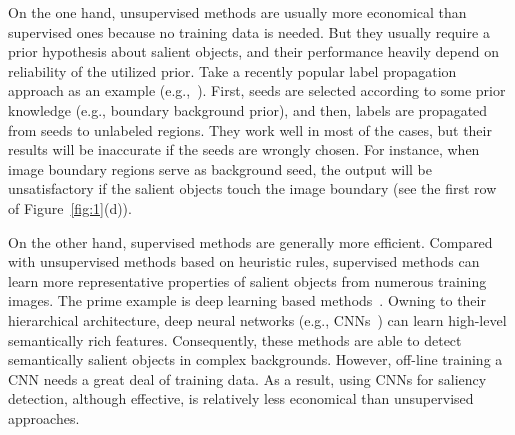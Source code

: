 \documentclass[journal]{IEEEtran}
\begin{document}
On the one hand, unsupervised methods are usually more economical than supervised ones because no training data is needed. But they usually require a prior hypothesis about salient objects, and their performance heavily depend on reliability of the utilized prior. Take a recently popular label propagation approach as an example (e.g.,~\cite{Jiang2013Saliency}\cite{yang2013saliency}\cite{Kong2016Pattern}\cite{Wang2016GraB}). First, seeds are selected according to some prior knowledge (e.g., boundary background prior), and then, labels are propagated from seeds to unlabeled regions. They work well in most of the cases, but their results will be inaccurate if the seeds are wrongly chosen. %
For instance, when image boundary regions serve as background seed, the output will be unsatisfactory if the salient objects touch the image boundary (see the first row of Figure~\ref{fig:1}(d)).

On the other hand, supervised methods are generally more efficient. Compared with unsupervised methods based on heuristic rules, supervised methods can learn more representative properties of salient objects from numerous training images. The prime example is deep learning based methods~\cite{Wang2015Deep}\cite{zhao2015saliency}\cite{Li2015Visual}\cite{Lee_2016_CVPR}. Owning to their hierarchical architecture, deep neural networks (e.g., CNNs~\cite{Lecun1998Gradient}) can learn high-level semantically rich features. Consequently, these methods are able to detect semantically salient objects in complex backgrounds. However, off-line training a CNN needs a great deal of training data. As a result, using CNNs for saliency detection, although effective, is relatively less economical than unsupervised approaches. 
\end{document}
